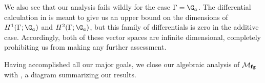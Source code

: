 \begin{remark}
We also see that our analysis fails wildly for the case $\Gamma = \G_a$.  The differential calculation in  is meant to give us an upper bound on the dimensions of $H^1(\Gamma; \G_a)$ and $H^2(\Gamma; \G_a)$, but this family of differentials is zero in the additive case.  Accordingly, both of these vector spaces are infinite dimensional, completely prohibiting us from making any further assessment.
\end{remark}

Having accomplished all our major goals, we close our algebraic analysis of $\mathcal{M}_{\mathbf{fg}}$ with , a diagram summarizing our results.

